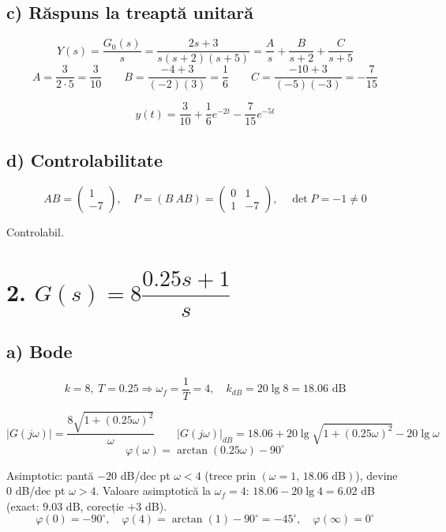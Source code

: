 \documentclass[10pt,a4paper]{article}
\begin{document}
\subsection*{c) Răspuns la treaptă unitară}
$$Y(s)=\frac{G_0(s)}{s}=\frac{2s+3}{s(s+2)(s+5)}=\frac{A}{s}+\frac{B}{s+2}+\frac{C}{s+5}$$
$$A=\frac{3}{2\cdot5}=\frac{3}{10}\qquad B=\frac{-4+3}{(-2)(3)}=\frac16\qquad C=\frac{-10+3}{(-5)(-3)}=-\frac{7}{15}$$
\begin{res}
$$y(t)=\frac{3}{10}+\frac16e^{-2t}-\frac7{15}e^{-5t}$$
\end{res}

\subsection*{d) Controlabilitate}
$$AB=\begin{pmatrix}1\\-7\end{pmatrix},\quad P=(B\ AB)=\begin{pmatrix}0&1\\1&-7\end{pmatrix},\quad \det P=-1\ne0$$
\begin{res}
Controlabil.
\end{res}

\section*{2. $G(s)=8\dfrac{0.25s+1}{s}$}

\subsection*{a) Bode}
$$k=8,\ T=0.25\Rightarrow \omega_f=\frac1T=4,\quad k_{dB}=20\lg8=18.06\text{ dB}$$
\begin{res}
$$|G(j\omega)|=\frac{8\sqrt{1+(0.25\omega)^2}}{\omega}\qquad |G(j\omega)|_{dB}=18.06+20\lg\sqrt{1+(0.25\omega)^2}-20\lg\omega$$
$$\varphi(\omega)=\arctan(0.25\omega)-90^\circ$$
\end{res}
Asimptotic: pantă $-20$ dB/dec pt $\omega<4$ (trece prin $(\omega{=}1,\,18.06\text{ dB})$), devine $0$ dB/dec pt $\omega>4$.
Valoare asimptotică la $\omega_f{=}4$: $18.06-20\lg4=6.02$ dB (exact: $9.03$ dB, corecție $+3$ dB).
$$\varphi(0)=-90^\circ,\quad \varphi(4)=\arctan(1)-90^\circ=-45^\circ,\quad \varphi(\infty)=0^\circ$$
\end{document}
